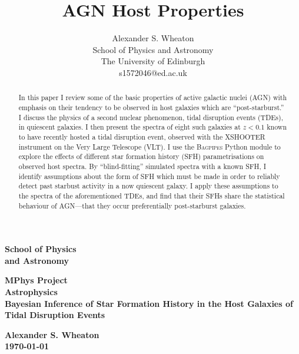 \documentclass[a4paper,12pt]{article}
\title{AGN Host Properties}
\author{
    Alexander S. Wheaton\\
    School of Physics and Astronomy\\
    The University of Edinburgh\\
    s1572046@ed.ac.uk\break
}
\begin{document}
\thispagestyle{empty}                   %
\epsfxsize=40mm                         %
\begin{minipage}[b]{110mm}
    {\Huge\bf School of Physics\\ and Astronomy
    \vspace*{17mm}}
\end{minipage}
\hfill
\begin{minipage}[t]{40mm}
\end{minipage}
\par\noindent                                           %
\begin{center}
    \Large\bf \Large\bf MPhys Project\\
    \Large\bf Astrophysics\\[10pt]                     %
    \LARGE\bf Bayesian Inference of Star Formation History in the Host Galaxies of Tidal Disruption Events
\end{center}
\vspace*{0.5cm}
\begin{center}
    \bf Alexander S. Wheaton\\
    \today
\end{center}

\begin{abstract}
  \noindent In this paper I review some of the basic properties of active
  galactic nuclei (AGN) with emphasis on their tendency to be observed in host
  galaxies which are ``post-starburst.'' I discuss the physics of a second
  nuclear phenomenon, tidal disruption events (TDEs), in quiescent galaxies. I
  then present the spectra of eight such galaxies at $z < 0.1$ known to have
  recently hosted a tidal disruption event, observed with the XSHOOTER
  instrument on the Very Large Telescope (VLT). I use the \textsc{Bagpipes}
  Python module to explore the effects of different star formation history
  (SFH) parametrisations on observed host spectra. By ``blind-fitting''
  simulated spectra with a known SFH, I identify assumptions about the form of
  SFH which must be made in order to reliably detect past starbust activity in
  a now quiescent galaxy. I apply these assumptions to the spectra of the
  aforementioned TDEs, and find that their SFHs share the statistical behaviour
  of AGN---that they occur preferentially post-starburst galaxies.
\end{abstract}
\end{document}
